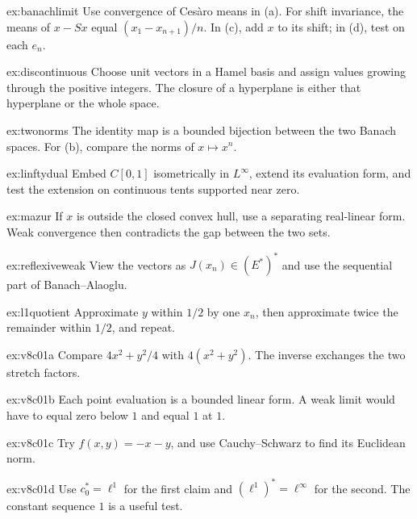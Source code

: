 \begin{hint}{ex:banachlimit}
Use convergence of Ces\`aro means in (a). For shift invariance, the means of $x-Sx$ equal $(x_1-x_{n+1})/n$. In (c), add $x$ to its shift; in (d), test on each $e_n$.
\end{hint}
\begin{hint}{ex:discontinuous}
Choose unit vectors in a Hamel basis and assign values growing through the positive integers. The closure of a hyperplane is either that hyperplane or the whole space.
\end{hint}
\begin{hint}{ex:twonorms}
The identity map is a bounded bijection between the two Banach spaces. For (b), compare the norms of $x\mapsto x^n$.
\end{hint}
\begin{hint}{ex:linftydual}
Embed $C[0,1]$ isometrically in $L^\infty$, extend its evaluation form, and test the extension on continuous tents supported near zero.
\end{hint}
\begin{hint}{ex:mazur}
If $x$ is outside the closed convex hull, use a separating real-linear form. Weak convergence then contradicts the gap between the two sets.
\end{hint}
\begin{hint}{ex:reflexiveweak}
View the vectors as $J(x_n)\in(E^*)^*$ and use the sequential part of Banach--Alaoglu.
\end{hint}
\begin{hint}{ex:l1quotient}
Approximate $y$ within $1/2$ by one $x_n$, then approximate twice the remainder within $1/2$, and repeat.
\end{hint}
\begin{hint}{ex:v8c01a}
Compare $4x^2+y^2/4$ with $4(x^2+y^2)$. The inverse exchanges the two stretch factors.
\end{hint}
\begin{hint}{ex:v8c01b}
Each point evaluation is a bounded linear form. A weak limit would have to equal zero below $1$ and equal $1$ at $1$.
\end{hint}
\begin{hint}{ex:v8c01c}
Try $f(x,y)=-x-y$, and use Cauchy--Schwarz to find its Euclidean norm.
\end{hint}
\begin{hint}{ex:v8c01d}
Use $c_0^*=\ell^1$ for the first claim and $(\ell^1)^*=\ell^\infty$ for the second. The constant sequence $1$ is a useful test.
\end{hint}

